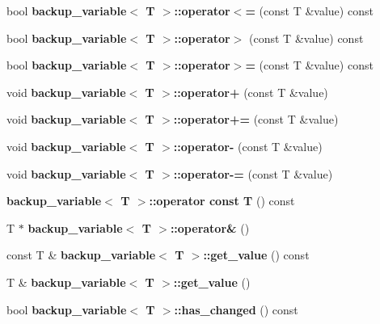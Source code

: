 \begin{DoxyCompactItemize}
\item 
bool {\bfseries backup\+\_\+variable$<$ T $>$\+::operator$<$=} (const T \&value) const \label{group___utilities_ga60de5d54f02e5d862ae851ab773830db}

\item 
bool {\bfseries backup\+\_\+variable$<$ T $>$\+::operator$>$} (const T \&value) const \label{group___utilities_ga1956d30f9a5124527ac9d52821ce9d72}

\item 
bool {\bfseries backup\+\_\+variable$<$ T $>$\+::operator$>$=} (const T \&value) const \label{group___utilities_ga0b749c6e3c84c43d094d1ba50d1a2323}

\item 
void {\bfseries backup\+\_\+variable$<$ T $>$\+::operator+} (const T \&value)\label{group___utilities_ga1ae3f1fcce3725da51aab2879c523a09}

\item 
void {\bfseries backup\+\_\+variable$<$ T $>$\+::operator+=} (const T \&value)\label{group___utilities_ga4b5753702dbfdaf23f9eb8b210ed80a2}

\item 
void {\bfseries backup\+\_\+variable$<$ T $>$\+::operator-\/} (const T \&value)\label{group___utilities_gabc321dce84d827d20d69b96653049739}

\item 
void {\bfseries backup\+\_\+variable$<$ T $>$\+::operator-\/=} (const T \&value)\label{group___utilities_gadc890d1d8539089e654280bf18e76034}

\item 
{\bfseries backup\+\_\+variable$<$ T $>$\+::operator const T} () const \label{group___utilities_gacba460a7693d0db536d7f9768ab6cf67}

\item 
T $\ast$ {\bfseries backup\+\_\+variable$<$ T $>$\+::operator\&} ()\label{group___utilities_ga61a6e2eee207d52e8f80f23595615627}

\item 
const T \& {\bfseries backup\+\_\+variable$<$ T $>$\+::get\+\_\+value} () const \label{group___utilities_ga636435af2389592a1b96038d83582d8a}

\item 
T \& {\bfseries backup\+\_\+variable$<$ T $>$\+::get\+\_\+value} ()\label{group___utilities_ga0338d95a730475c9ec88aff25c76b80f}

\item 
bool {\bfseries backup\+\_\+variable$<$ T $>$\+::has\+\_\+changed} () const \label{group___utilities_ga4d062c1afac850f6e965ccf6ebdca951}


\end{DoxyCompactItemize}
